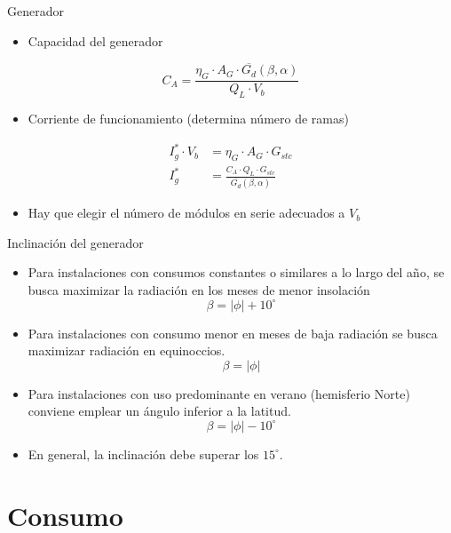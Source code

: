 \documentclass[xcolor={usenames,svgnames,dvipsnames}]{beamer}
\begin{document}
\begin{frame}[label={sec:orgb7aff2a}]{Generador}
\begin{itemize}
\item Capacidad del generador
\end{itemize}
\[
C_{A} = \frac{\eta_{G}\cdot A_{G}\cdot\overline{G_{d}}(\beta,\alpha)}{Q_L \cdot V_b}
\]


\begin{itemize}
\item Corriente de funcionamiento (determina número de ramas)
\end{itemize}

\begin{align*}
I_{g}^{*}\cdot V_{b} &= \eta_{G}\cdot A_{G}\cdot G_{stc}\\
I_{g}^{*} &=  \frac{C_{A}\cdot Q_{L}\cdot G_{stc}}{\overline{G_{d}}(\beta,\alpha)}
\end{align*}

\begin{itemize}
\item Hay que elegir el número de módulos en serie adecuados a \(V_b\)
\end{itemize}
\end{frame}

\begin{frame}[label={sec:org967fca2}]{Inclinación del generador}
\begin{itemize}
\item Para instalaciones con \alert{consumos constantes o similares a lo largo del año}, se busca maximizar la radiación en los meses de menor insolación $$\beta=|\phi|+10^{\circ}$$

\item Para instalaciones con \alert{consumo menor en meses de baja radiación} se busca maximizar radiación en equinoccios.$$\beta=|\phi|$$

\item Para instalaciones con \alert{uso predominante en verano} (hemisferio Norte) conviene emplear un ángulo inferior a la latitud. $$\beta=|\phi|-10^{\circ}$$

\item En general, la inclinación \alert{debe superar} los \(15^{\circ}\).
\end{itemize}
\end{frame}

\section{Consumo}
\label{sec:orga267e17}
\end{document}
